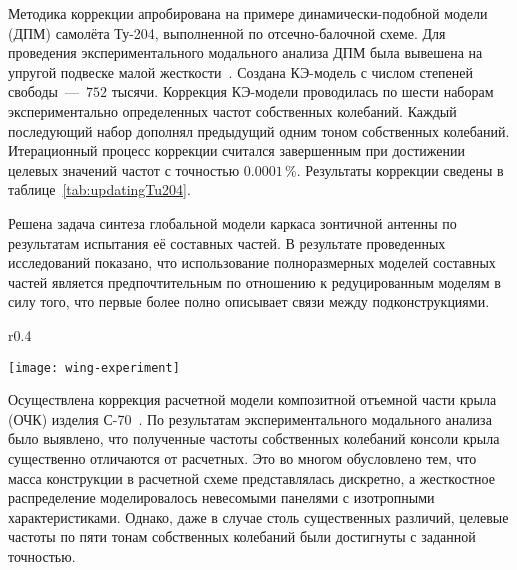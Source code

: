 Методика коррекции апробирована на примере динамически-подобной модели (ДПМ) самолёта \mbox{Ту-204}, выполненной по отсечно-балочной схеме. Для проведения экспериментального модального анализа ДПМ была вывешена на упругой подвеске малой жесткости~. Создана КЭ-модель  с числом степеней свободы~---~$ 752 $ тысячи. Коррекция КЭ-модели проводилась по шести наборам экспериментально определенных частот собственных колебаний. Каждый последующий набор дополнял предыдущий одним тоном собственных колебаний. Итерационный процесс коррекции считался завершенным при достижении целевых значений частот с точностью $0.0001$\,\%. Результаты коррекции сведены в таблице~\ref{tab:updatingTu204}. 

Решена задача синтеза глобальной модели каркаса зонтичной антенны по результатам испытания её составных частей. В результате проведенных исследований показано, что использование полноразмерных моделей составных частей является предпочтительным по отношению к редуцированным моделям в силу того, что первые более полно описывает связи между подконструкциями.

\begin{wrapfigure}[11]{r}{0.4\textwidth}
	\begin{center}
		\vspace{-5em}
		\texttt{[image: wing-experiment]} 
		 \label{fig:wing-experiment}
	\end{center}
\end{wrapfigure}

Осуществлена коррекция расчетной модели композитной отъемной части крыла (ОЧК) изделия \mbox{С-70}~. По результатам экспериментального модального анализа было выявлено, что полученные частоты собственных колебаний консоли крыла существенно отличаются от расчетных. Это во многом обусловлено тем, что масса конструкции в расчетной схеме представлялась дискретно, а жесткостное распределение моделировалось невесомыми панелями с изотропными характеристиками. Однако, даже в случае столь существенных различий, целевые частоты по пяти тонам собственных колебаний были достигнуты с заданной точностью. 

